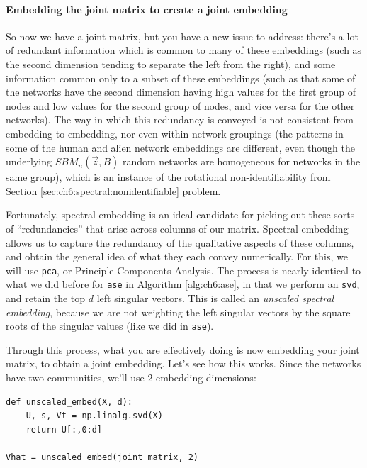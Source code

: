 \paragraph{Embedding the joint matrix to create a joint embedding}

So now we have a joint matrix, but you have a new issue to address: there's a lot of redundant information which is common to many of these embeddings (such as the second dimension tending to separate the left from the right), and some information common only to a subset of these embeddings (such as that some of the networks have the second dimension having high values for the first group of nodes and low values for the second group of nodes, and vice versa for the other networks). The way in which this redundancy is conveyed is not consistent from embedding to embedding, nor even within network groupings (the patterns in some of the human and alien network embeddings are different, even though the underlying $SBM_n(\vec z, B)$ random networks are homogeneous for networks in the same group), which is an instance of the rotational non-identifiability from Section \ref{sec:ch6:spectral:nonidentifiable} problem.

Fortunately, spectral embedding is an ideal candidate for picking out these sorts of ``redundancies'' that arise across columns of our matrix. Spectral embedding allows us to capture the redundancy of the qualitative aspects of these columns, and obtain the general idea of what they each convey numerically. For this, we will use \texttt{pca}, or Principle Components Analysis. The process is nearly identical to what we did before for \texttt{ase} in Algorithm \ref{alg:ch6:ase}, in that we perform an \texttt{svd}, and retain the top $d$ left singular vectors. This is called an \textit{unscaled spectral embedding}, because we are not weighting the left singular vectors by the square roots of the singular values (like we did in \texttt{ase}).

Through this process, what you are effectively doing is now embedding your joint matrix, to obtain a joint embedding. Let's see how this works. Since the networks have two communities, we'll use $2$ embedding dimensions:

\begin{lstlisting}[style=python]
def unscaled_embed(X, d):
    U, s, Vt = np.linalg.svd(X)
    return U[:,0:d]

Vhat = unscaled_embed(joint_matrix, 2)
\end{lstlisting}

